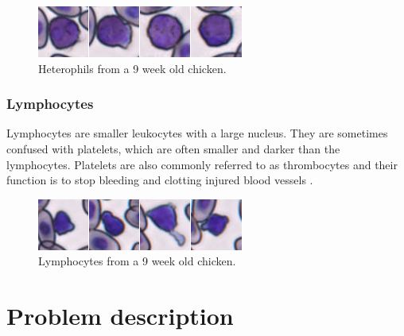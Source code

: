 \begin{figure}[h!]
    \centering
    \includegraphics{heterophils_.png}
    \caption{Heterophils from a 9 week old chicken.}
    \label{fig:heterophil}
\end{figure}

\subsubsection{Lymphocytes}
Lymphocytes are smaller leukocytes with a large nucleus. They are sometimes confused with platelets, which are often smaller and darker than the lymphocytes. Platelets are also commonly referred to as thrombocytes and their function is to stop bleeding and clotting injured blood vessels \cite{NYAS:NYAS297}.
\begin{figure}[h!]
    \centering
    \includegraphics{lymphocytes_.png}
    \caption{Lymphocytes from a 9 week old chicken.}
    \label{fig:heterophil}
\end{figure}

\section{Problem description}

